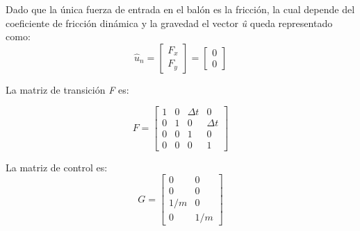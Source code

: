Dado que la única fuerza de entrada en el balón es la fricción, la cual depende del coeficiente de fricción dinámica y la gravedad el vector \textit{û} queda representado como:
\begin{equation}
\hat{u}_n = \begin{bmatrix}
F_x\\
F_y
\end{bmatrix} = 
\begin{bmatrix}
0\\
0
\end{bmatrix}
\label{eq:input_signal}
\end{equation}

La matriz de transición \textit{F} es:

\begin{equation}
F = \begin{bmatrix}
1 & 0 & \Delta t & 0\\ 
0 & 1 & 0 & \Delta t\\ 
0 & 0 & 1 & 0\\ 
0 & 0 & 0 & 1
\end{bmatrix}
\label{eq:transition_matrix}
\end{equation}

La matriz de control es:
\begin{equation}
G = \begin{bmatrix}
0 & 0 \\ %
0 & 0 \\ %
 1/m & 0 \\ %
0 & 1/m
\end{bmatrix}
\label{eq:control_matrix}
\end{equation}

